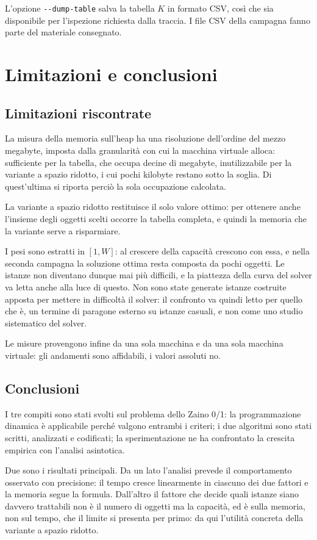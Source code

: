 \documentclass[11pt]{article}
\begin{document}
\noindent
L'opzione \texttt{-{}-dump-table} salva la tabella $K$ in formato CSV, cos\`i che
sia disponibile per l'ispezione richiesta dalla traccia. I file CSV della
campagna fanno parte del materiale consegnato.

\section{Limitazioni e conclusioni}

\subsection{Limitazioni riscontrate}\label{sec:limitazioni}
La misura della memoria sull'heap ha una risoluzione dell'ordine del mezzo
megabyte, imposta dalla granularit\`a con cui la macchina virtuale alloca:
sufficiente per la tabella, che occupa decine di megabyte,
inutilizzabile per la variante a spazio ridotto, i cui pochi kilobyte restano
sotto la soglia. Di quest'ultima si riporta perci\`o la sola occupazione
calcolata.

La variante a spazio ridotto restituisce il solo valore ottimo: per ottenere
anche l'insieme degli oggetti scelti occorre la tabella completa, e quindi la
memoria che la variante serve a risparmiare.

I pesi sono estratti in $[1,W]$: al crescere della capacit\`a crescono con essa,
e nella seconda campagna la soluzione ottima resta composta da pochi oggetti.
Le istanze non diventano dunque mai pi\`u difficili, e la piattezza della curva
del solver va letta anche alla luce di questo. Non sono state generate istanze
costruite apposta per mettere in difficolt\`a il solver: il confronto va quindi
letto per quello che \`e, un termine di paragone esterno su istanze casuali, e
non come uno studio sistematico del solver.

Le misure provengono infine da una sola macchina e da una sola macchina
virtuale: gli andamenti sono affidabili, i valori assoluti no.

\subsection{Conclusioni}
I tre compiti sono stati svolti sul problema dello Zaino 0/1: la programmazione
dinamica \`e applicabile perch\'e valgono entrambi i criteri; i due algoritmi
sono stati scritti, analizzati e codificati; la sperimentazione ne ha confrontato
la crescita empirica con l'analisi asintotica.

Due sono i risultati principali. Da un lato l'analisi prevede il comportamento
osservato con precisione: il tempo cresce linearmente in ciascuno dei due
fattori e la memoria segue la formula. Dall'altro il fattore che
decide quali istanze siano davvero trattabili non \`e il numero di oggetti ma la
capacit\`a, ed \`e sulla memoria, non sul tempo, che il limite si presenta per
primo: da qui l'utilit\`a concreta della variante a spazio ridotto.
\end{document}
